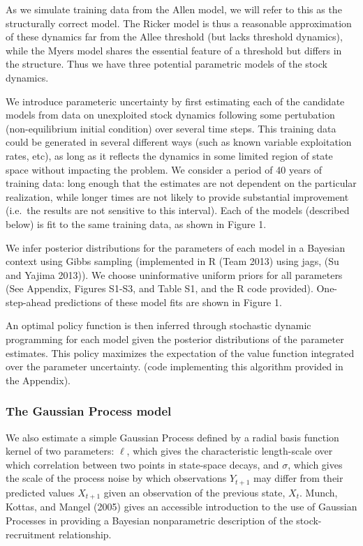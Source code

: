\documentclass[author-year, review]{elsarticle} %
\begin{document}
As we simulate training data from the Allen model, we will refer to this
as the structurally correct model. The Ricker model is thus a reasonable
approximation of these dynamics far from the Allee threshold (but lacks
threshold dynamics), while the Myers model shares the essential feature
of a threshold but differs in the structure. Thus we have three
potential parametric models of the stock dynamics.

We introduce parameteric uncertainty by first estimating each of the
candidate models from data on unexploited stock dynamics following some
pertubation (non-equilibrium initial condition) over several time steps.
This training data could be generated in several different ways (such as
known variable exploitation rates, etc), as long as it reflects the
dynamics in some limited region of state space without impacting the
problem. We consider a period of 40 years of training data: long enough
that the estimates are not dependent on the particular realization,
while longer times are not likely to provide substantial improvement
(i.e.~the results are not sensitive to this interval). Each of the
models (described below) is fit to the same training data, as shown in
Figure 1.

We infer posterior distributions for the parameters of each model in a
Bayesian context using Gibbs sampling (implemented in R (Team 2013)
using jags, (Su and Yajima 2013)). We choose uninformative uniform
priors for all parameters (See Appendix, Figures S1-S3, and Table S1,
and the R code provided). One-step-ahead predictions of these model fits
are shown in Figure 1.

An optimal policy function is then inferred through stochastic dynamic
programming for each model given the posterior distributions of the
parameter estimates. This policy maximizes the expectation of the value
function integrated over the parameter uncertainty. (code implementing
this algorithm provided in the Appendix).

\subsubsection{The Gaussian Process
model}\label{the-gaussian-process-model}

We also estimate a simple Gaussian Process defined by a radial basis
function kernel of two parameters: $\ell$, which gives the
characteristic length-scale over which correlation between two points in
state-space decays, and $\sigma$, which gives the scale of the process
noise by which observations $Y_{t+1}$ may differ from their predicted
values $X_{t+1}$ given an observation of the previous state, $X_t$.
Munch, Kottas, and Mangel (2005) gives an accessible introduction to the
use of Gaussian Processes in providing a Bayesian nonparametric
description of the stock-recruitment relationship.
\end{document}
